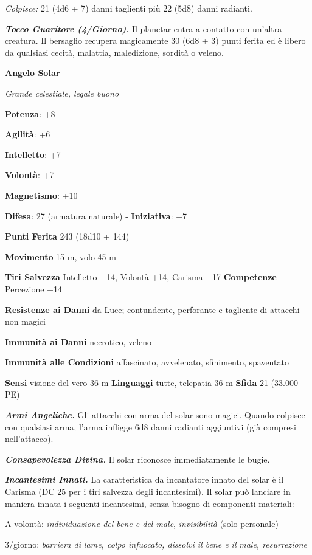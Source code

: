 \begin{multicols}{2}
\emph{Colpisce:} 21 (4d6 + 7) danni taglienti più 22 (5d8) danni
radianti.

\emph{\textbf{Tocco Guaritore (4/Giorno).}} Il planetar entra a contatto
con un'altra creatura. Il bersaglio recupera magicamente 30 (6d8 + 3)
punti ferita ed è libero da qualsiasi cecità, malattia, maledizione,
sordità o veleno.

\textbf{Angelo Solar}

\emph{Grande celestiale, legale buono}

\textbf{Potenza}: +8

\textbf{Agilità}: +6

\textbf{Intelletto}: +7

\textbf{Volontà}: +7

\textbf{Magnetismo}: +10

\textbf{Difesa}: 27 (armatura naturale) - \textbf{Iniziativa}: +7

\textbf{Punti Ferita} 243 (18d10 + 144)

\textbf{Movimento} 15 m, volo 45 m

\textbf{Tiri Salvezza} Intelletto +14, Volontà +14, Carisma +17
\textbf{Competenze} Percezione +14

\textbf{Resistenze ai Danni} da Luce; contundente, perforante e
tagliente di attacchi non magici

\textbf{Immunità ai Danni} necrotico, veleno

\textbf{Immunità alle Condizioni} affascinato, avvelenato, sfinimento,
spaventato

\textbf{Sensi} visione del vero 36 m
\textbf{Linguaggi} tutte, telepatia 36 m \textbf{Sfida} 21 (33.000 PE)

\emph{\textbf{Armi Angeliche.}} Gli attacchi con arma del solar sono
magici. Quando colpisce con qualsiasi arma, l'arma infligge 6d8 danni
radianti aggiuntivi (già compresi nell'attacco).

\emph{\textbf{Consapevolezza Divina.}} Il solar riconosce immediatamente
le bugie.

\emph{\textbf{Incantesimi Innati.}} La caratteristica da incantatore
innato del solar è il Carisma (DC 25 per i tiri salvezza degli
incantesimi). Il solar può lanciare in maniera innata i seguenti
incantesimi, senza bisogno di componenti materiali:

A volontà: \emph{individuazione del bene e del male},
\emph{invisibilità} (solo personale)

3/giorno: \emph{barriera di lame, colpo infuocato, dissolvi il bene e
il} \emph{male, resurrezione}


\end{multicols}
